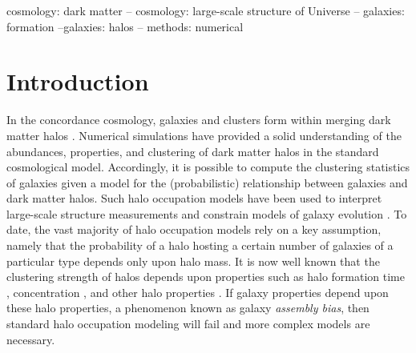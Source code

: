 \documentclass[usenatbib]{mnras}
\begin{document}
\begin{keywords}
cosmology: dark matter -- cosmology: large-scale structure of Universe -- galaxies: formation --galaxies: halos -- methods: numerical
\end{keywords}




\section{Introduction}
\label{section:introduction}

In the concordance cosmology, galaxies and clusters form within merging dark matter halos \citep{white_rees78,blumenthal_etal84, mo_etal10}. Numerical simulations have provided a solid understanding of the abundances, properties, and 
clustering of dark matter halos in the standard cosmological model. Accordingly, it is possible to compute the 
clustering statistics of galaxies given a model for the (probabilistic) relationship between galaxies and dark matter halos. 
Such halo occupation models have been used to interpret large-scale structure measurements and 
constrain models of galaxy evolution \citep{yang_etal03,tinker_etal05,zehavi_etal05b,porciani_norberg06,vdbosch_etal07,zheng_etal07,conroy_wechsler09,
yang_etal09b,zehavi_etal11,guo_etal11a,wake_etal11,yang_etal11a,yang_etal12,leauthaud_etal12,
rodriguezpuebla_etal12, behroozi_etal13b, moster_etal13, tinker_etal13,cacciato_etal13,more_etal13,guo_etal14,
zu_mandelbaum15b}.
To date, the vast majority of halo occupation models rely on a key assumption, namely that 
the probability of a halo hosting a certain number of galaxies of a particular type 
depends only upon halo mass. It is now well known that the clustering strength of halos depends upon 
properties such as halo formation time \citep{gao_etal05,harker_etal06, wechsler_etal06,gao_white07,croton_etal07,zentner07,dalal_etal08, li_etal08, lacerna_padilla11}, 
concentration \citep{wechsler_etal06,faltenbacher_white10, mao_etal15}, and other halo properties \citep{bett_etal06, hahn_etal07a, hahn_etal07b, faltenbacher_white10, vandaalen_etal12, fisher_faltenbacher16, sunayama_etal16, chavesmontero_etal16}. 
If galaxy properties depend upon these halo properties, a phenomenon known as galaxy {\em assembly bias}, 
then standard halo occupation modeling will fail \citep{zentner_etal14} 
and more complex models \citep{gilmarin_etal11, hearin_etal16} are necessary.
\end{document}
